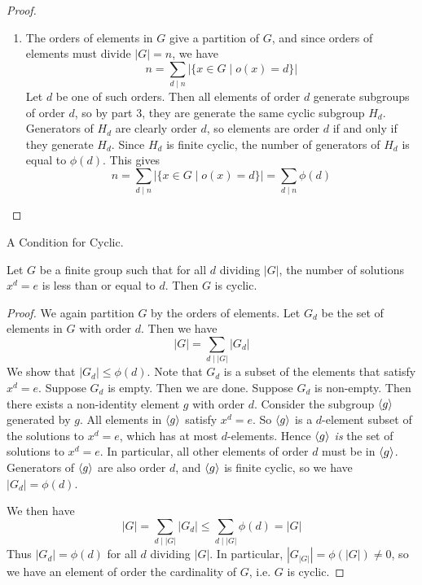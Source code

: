\documentclass[../../book.tex]{subfiles}
\begin{document}
\begin{proof}
\begin{enumerate}
        \item The orders of elements in $G$ give a partition of $G$,
        and since orders of elements must divide $|G| = n$, we have \[
            n = \sum_{d \mid n} |\{x \in G \mid o(x) = d\}|
        \]
        Let $d$ be one of such orders. 
        Then all elements of order $d$ generate subgroups of order $d$,
        so by part 3, they are generate the same cyclic subgroup $H_d$. 
        Generators of $H_d$ are clearly order $d$, 
        so elements are order $d$ if and only if they generate $H_d$.
        Since $H_d$ is finite cyclic, 
        the number of generators of $H_d$ is equal to $\phi(d)$. 
        This gives \[
            n = \sum_{d \mid n} |\{x \in G \mid o(x) = d\}|
            = \sum_{d \mid n} \phi(d)
        \]
    \end{enumerate}
\end{proof}

\begin{thm} A Condition for Cyclic.
    
    Let $G$ be a finite group such that for all $d$ dividing $|G|$, 
    the number of solutions $x^d = e$ is less than or equal to $d$. 
    Then $G$ is cyclic.
\end{thm}
\begin{proof}
    
    We again partition $G$ by the orders of elements. 
    Let $G_d$ be the set of elements in $G$ with order $d$. 
    Then we have \[
        |G| = \sum_{d \mid |G|} |G_d|
    \]
    We show that $|G_d| \leq \phi(d)$. 
    Note that $G_d$ is a subset of the elements that satisfy $x^d = e$. 
    Suppose $G_d$ is empty. Then we are done.
    Suppose $G_d$ is non-empty. 
    Then there exists a non-identity element $g$ with order $d$.
    Consider the subgroup $\langle g\rangle$ generated by $g$. 
    All elements in $\langle g\rangle$ satisfy $x^d = e$.
    So $\langle g\rangle$ is a $d$-element subset of the solutions to $x^d = e$,
    which has at most $d$-elements.
    Hence $\langle g\rangle$ \emph{is} the set of solutions to $x^d = e$.
    In particular, all other elements of order $d$ must be in $\langle g\rangle$.
    Generators of $\langle g\rangle$ are also order $d$, 
    and $\langle g\rangle$ is finite cyclic, so we have $|G_d| = \phi(d)$. 
    
    We then have \[
        |G| = \sum_{d \mid |G|} |G_d| \leq \sum_{d \mid |G|} \phi(d) = |G|
    \]
    Thus $|G_d| = \phi(d)$ for all $d$ dividing $|G|$. 
    In particular, $|G_{|G|}| = \phi(|G|) \neq 0$, 
    so we have an element of order the cardinality of $G$,
    i.e. $G$ is cyclic.
\end{proof}
\end{document}
